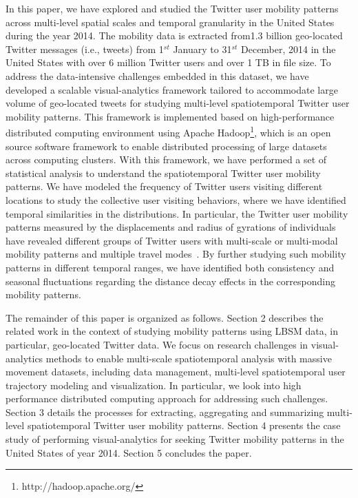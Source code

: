 \documentclass[a4paper, 11pt]{article}
\begin{document}
In this paper, we have explored and studied the Twitter user mobility patterns across multi-level spatial scales and temporal granularity in the United States during the year 2014. 
The mobility data is extracted from1.3 billion geo-located Twitter messages (i.e., tweets) from 1$^{st}$ January to 31$^{st}$ December, 2014 in the United States with over 6 million Twitter users and over 1 TB in file size. 
To address the data-intensive challenges embedded in this dataset, we have developed a scalable visual-analytics framework tailored to accommodate large volume of geo-located tweets for studying multi-level spatiotemporal Twitter user mobility patterns.
This framework is implemented based on high-performance distributed computing environment using Apache Hadoop\footnote{http://hadoop.apache.org/}, which is an open source software framework to enable distributed processing of large datasets across computing clusters.
With this framework, we have performed a set of statistical analysis to understand the spatiotemporal Twitter user mobility patterns. 
We have modeled the frequency of Twitter users visiting different locations to study the collective user visiting behaviors, where we have identified temporal similarities in the distributions. 
In particular, the Twitter user mobility patterns measured by the displacements and radius of gyrations of individuals~\citep{gonzalez2008understanding} have revealed different groups of Twitter users with multi-scale or multi-modal mobility patterns and multiple travel modes~\citep{Jurdak2015}.
By further studying such mobility patterns in different temporal ranges, we have identified both consistency and seasonal fluctuations regarding the distance decay effects in the corresponding mobility patterns. 

The remainder of this paper is organized as follows.
Section 2 describes the related work in the context of studying mobility patterns using LBSM data, in particular, geo-located Twitter data.
We focus on research challenges in visual-analytics methods to enable multi-scale
spatiotemporal analysis with massive movement datasets, including data management, multi-level spatiotemporal user trajectory modeling and visualization.
In particular, we look into high performance distributed computing approach for addressing such challenges.
Section 3 details the processes for extracting, aggregating and summarizing multi-level spatiotemporal Twitter user mobility patterns.
Section 4 presents the case study of performing visual-analytics for seeking Twitter mobility patterns in the United States of year 2014. Section 5 concludes the paper.
\end{document}

